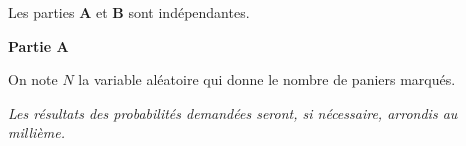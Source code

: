 
\medskip


Les parties \textbf{A} et \textbf{B} sont indépendantes.

\bigskip

\textbf{Partie A}

\medskip
%
%

On note $N$ la variable aléatoire qui donne le nombre de paniers marqués.

\medskip

\emph{Les résultats des probabilités demandées seront, si nécessaire, arrondis au millième.}

